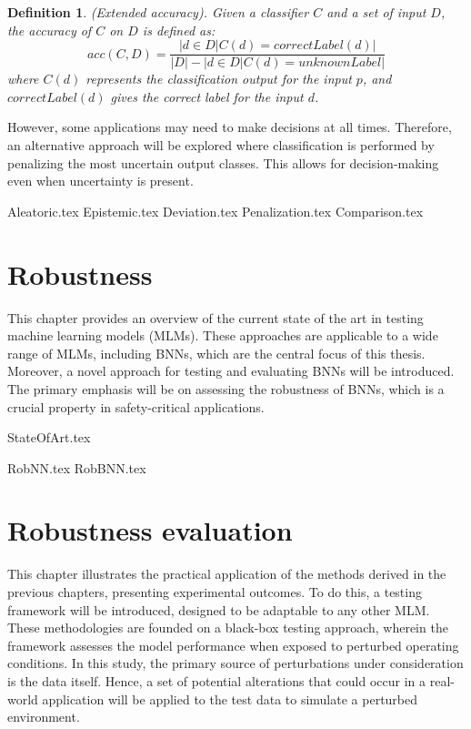 \documentclass[
	a4paper,
	cleardoublepage=empty,
	headings=twolinechapter,
	numbers=autoenddot,
]{scrbook}
\newtheorem{definition}{Definition}[section]
\begin{document}
	\begin{definition} (Extended accuracy).
		Given a classifier $C$ and a set of input $D$, the accuracy of $C$ on $D$ is defined as:
		\[
			acc(C,D) = \frac{|{d \in D | C(d) = correctLabel(d)}|}{|D| - |{d \in D | C(d) = unknownLabel}|}
		\] 
		where $C(d)$ represents the classification output for the input $p$, and $correctLabel(d)$ gives the correct label for the input $d$.
	\end{definition}
	
	However, some applications may need to make decisions at all times. Therefore, an alternative approach will be explored where classification is performed by penalizing the most uncertain output classes. This allows for decision-making even when uncertainty is present.
	
	{Aleatoric.tex}
	{Epistemic.tex}
	{Deviation.tex}
	{Penalization.tex}
	{Comparison.tex}
	
	\chapter{Robustness}\label{chap:c4}
	
	This chapter provides an overview of the current state of the art in testing machine learning models (MLMs). These approaches are applicable to a wide range of MLMs, including BNNs, which are the central focus of this thesis. Moreover, a novel approach for testing and evaluating BNNs will be introduced. The primary emphasis will be on assessing the robustness of BNNs, which is a crucial property in safety-critical applications.
	
	{StateOfArt.tex}
	
	{RobNN.tex}
	{RobBNN.tex}
	
	\chapter{Robustness evaluation}\label{chap:c5}
	
	This chapter illustrates the practical application of the methods derived in the previous chapters, presenting experimental outcomes. To do this, a testing framework will be introduced, designed to be adaptable to any other MLM. These methodologies are founded on a black-box testing approach, wherein the framework assesses the model performance when exposed to perturbed operating conditions. In this study, the primary source of perturbations under consideration is the data itself. Hence, a set of potential alterations that could occur in a real-world application will be applied to the test data to simulate a perturbed environment.
	
\end{document}
